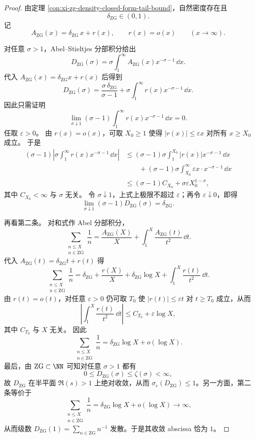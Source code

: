 \begin{proof}
由定理 \ref{con:xi-zg-density-closed-form-tail-bound}，自然密度存在且
\[
\delta_{\mathrm{ZG}}\in(0,1).
\]
记
\[
A_{\mathrm{ZG}}(x)=\delta_{\mathrm{ZG}}\,x+r(x),
\qquad
r(x)=o(x)
\qquad (x\to\infty).
\]

对任意 \(\sigma>1\)，Abel--Stieltjes 分部积分给出
\[
D_{\mathrm{ZG}}(\sigma)
=
\sigma\int_1^\infty A_{\mathrm{ZG}}(x)x^{-\sigma-1}\,\dd x.
\]
代入 \(A_{\mathrm{ZG}}(x)=\delta_{\mathrm{ZG}}x+r(x)\) 后得到
\[
D_{\mathrm{ZG}}(\sigma)
=
\frac{\sigma\,\delta_{\mathrm{ZG}}}{\sigma-1}
+
\sigma\int_1^\infty r(x)x^{-\sigma-1}\,\dd x.
\]
因此只需证明
\[
\lim_{\sigma\downarrow1}
(\sigma-1)\int_1^\infty r(x)x^{-\sigma-1}\,\dd x=0.
\]
任取 \(\varepsilon>0\)。
由 \(r(x)=o(x)\)，可取 \(X_0\ge 1\) 使得 \(|r(x)|\le \varepsilon x\) 对所有 \(x\ge X_0\) 成立。
于是
\[
\begin{aligned}
(\sigma-1)\left|\sigma\int_1^\infty r(x)x^{-\sigma-1}\,\dd x\right|
&\le
(\sigma-1)\sigma\int_1^{X_0}|r(x)|x^{-\sigma-1}\,\dd x \\
&\qquad
+(\sigma-1)\sigma\int_{X_0}^{\infty}\varepsilon x\cdot x^{-\sigma-1}\,\dd x \\
&\le
(\sigma-1)C_{X_0}
+\sigma\varepsilon X_0^{1-\sigma},
\end{aligned}
\]
其中 \(C_{X_0}<\infty\) 与 \(\sigma\) 无关。
令 \(\sigma\downarrow1\)，上式上极限不超过 \(\varepsilon\)；再令 \(\varepsilon\downarrow0\)，即得
\[
\lim_{\sigma\downarrow 1}(\sigma-1)D_{\mathrm{ZG}}(\sigma)=\delta_{\mathrm{ZG}}.
\]

再看第二条。
对和式作 Abel 分部积分，
\[
\sum_{\substack{n\le X\\ n\in\mathrm{ZG}}}\frac1n
=
\frac{A_{\mathrm{ZG}}(X)}{X}+\int_1^X \frac{A_{\mathrm{ZG}}(t)}{t^2}\,\dd t.
\]
代入 \(A_{\mathrm{ZG}}(t)=\delta_{\mathrm{ZG}}t+r(t)\) 得
\[
\sum_{\substack{n\le X\\ n\in\mathrm{ZG}}}\frac1n
=
\delta_{\mathrm{ZG}}
+\frac{r(X)}{X}
+\delta_{\mathrm{ZG}}\log X
+\int_1^X \frac{r(t)}{t^2}\,\dd t.
\]
由 \(r(t)=o(t)\)，对任意 \(\varepsilon>0\) 仍可取 \(T_0\) 使 \(|r(t)|\le \varepsilon t\) 对 \(t\ge T_0\) 成立，从而
\[
\left|\int_1^X \frac{r(t)}{t^2}\,\dd t\right|
\le C_{T_0}+\varepsilon\log X,
\]
其中 \(C_{T_0}\) 与 \(X\) 无关。
因此
\[
\sum_{\substack{n\le X\\ n\in\mathrm{ZG}}}\frac1n
=
\delta_{\mathrm{ZG}}\log X+o(\log X).
\]
最后，由 \(\mathrm{ZG}\subset \NN\) 可知对任意 \(\sigma>1\) 都有
\[
0\le D_{\mathrm{ZG}}(\sigma)\le \zeta(\sigma)<\infty,
\]
故 \(D_{\mathrm{ZG}}\) 在半平面 \(\Re(s)>1\) 上绝对收敛，从而 \(\sigma_c(D_{\mathrm{ZG}})\le 1\)。另一方面，第二条等价于
\[
\sum_{\substack{n\le X\\ n\in\mathrm{ZG}}}\frac1n
=
\delta_{\mathrm{ZG}}\log X+o(\log X)\to\infty,
\]
从而级数 \(D_{\mathrm{ZG}}(1)=\sum_{n\in\mathrm{ZG}}n^{-1}\) 发散。于是其收敛 abscissa 恰为 \(1\)。
\end{proof}

